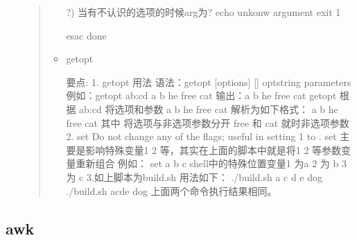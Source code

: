 \documentclass[a4paper,10pt,english]{sphinxmanual}
\begin{document}
\begin{itemize}
\begin{quote}
\begin{itemize}
\begin{sphinxVerbatim}[commandchars=\\\{\}]
             ?)  \PYGZsh{}当有不认识的选项的时候arg为?
            echo \PYGZdq{}unkonw argument\PYGZdq{}
        exit 1

        esac
done
\end{sphinxVerbatim}

\item {} 
getopt

\begin{sphinxVerbatim}[commandchars=\\\{\}]
要点:
1. getopt 用法
语法：getopt [options] [\PYGZhy{}\PYGZhy{}] optstring parameters
例如：getopt ab:cd \PYGZhy{}a \PYGZhy{}b he free cat
输出：\PYGZhy{}a \PYGZhy{}b he \PYGZhy{}\PYGZhy{} free cat
            getopt 根据 ab:cd 将选项和参数 \PYGZhy{}a \PYGZhy{}b he free cat  解析为如下格式：
            \PYGZhy{}a \PYGZhy{}b he \PYGZhy{}\PYGZhy{} free cat
             其中 \PYGZhy{}\PYGZhy{} 将选项与非选项参数分开 free 和 cat 就时非选项参数
2. set \PYGZhy{}\PYGZhy{}
\PYGZhy{}\PYGZhy{} Do not change any of the flags; useful in setting \PYGZdl{}1 to \PYGZhy{}.
set \PYGZhy{}\PYGZhy{}  主要是影响特殊变量\PYGZdl{}1 \PYGZdl{}2 等，其实在上面的脚本中就是将\PYGZdl{}1 \PYGZdl{}2 等参数变量重新组合
例如：
set \PYGZhy{}\PYGZhy{} a b c
shell中的特殊位置变量\PYGZdl{}1 为a \PYGZdl{}2 为 b \PYGZdl{}3 为 c
3.如上脚本为build.sh 用法如下：
./build.sh \PYGZhy{}a \PYGZhy{}c \PYGZhy{}d \PYGZhy{}e dog
./build.sh \PYGZhy{}acde  dog
上面两个命令执行结果相同。
\end{sphinxVerbatim}

\end{itemize}
\end{quote}

\end{itemize}


\subsection{awk}
\label{\detokenize{linux/shell:awk}}
\end{document}
